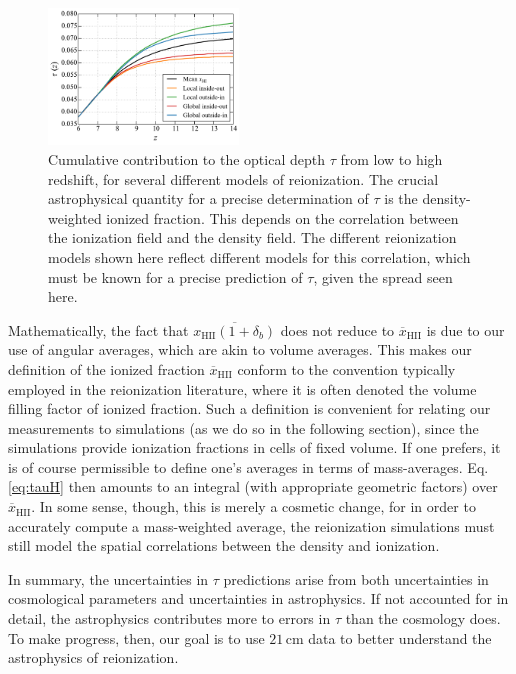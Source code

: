 \documentclass[twocolumn,aps,prd,nofootinbib,showpacs]{revtex4-1}
\begin{document}
\begin{figure}[!]
	\centering
	\includegraphics[width=0.45\textwidth]{figures/insideOutvsOutsideIn.pdf}
	\caption{Cumulative contribution to the optical depth $\tau$ from low to high redshift, for several different models of reionization. The crucial astrophysical quantity for a precise determination of $\tau$ is the density-weighted ionized fraction. This depends on the correlation between the ionization field and the density field. The different reionization models shown here reflect different models for this correlation, which must be known for a precise prediction of $\tau$, given the spread seen here.}
	\label{fig:InsideOutvsOutsideIn}
\end{figure}

Mathematically, the fact that $\overline{x_\textrm{HII} (1+\delta_b) }$ does not reduce to $\overline{x}_\textrm{HII}$ is due to our use of angular averages, which are akin to volume averages. This makes our definition of the ionized fraction $\overline{x}_\textrm{HII}$ conform to the convention typically employed in the reionization literature, where it is often denoted the volume filling factor of ionized fraction. Such a definition is convenient for relating our measurements to simulations (as we do so in the following section), since the simulations provide ionization fractions in cells of fixed volume. If one prefers, it is of course permissible to define one's averages in terms of mass-averages. Eq. \eqref{eq:tauH} then amounts to an integral (with appropriate geometric factors) over $\overline{x}_\textrm{HII}$. In some sense, though, this is merely a cosmetic change, for in order to accurately compute a mass-weighted average, the reionization simulations must still model the spatial correlations between the density and ionization.

In summary, the uncertainties in $\tau$ predictions arise from both uncertainties in cosmological parameters and uncertainties in astrophysics. If not accounted for in detail, the astrophysics contributes more to errors in $\tau$ than the cosmology does. To make progress, then, our goal is to use $21\,\textrm{cm}$ data to better understand the astrophysics of reionization.
\end{document}
